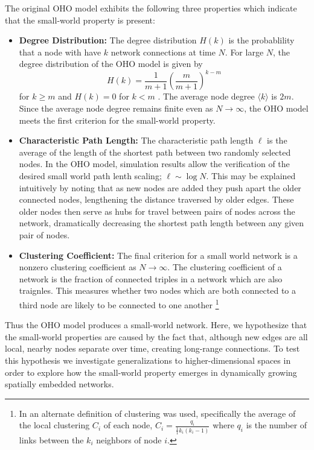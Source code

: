 \documentclass[aps,pre,reprint,superscriptaddress,amsmath,amssymb,nofootinbib]{revtex4-1}
\begin{document}
The original OHO model exhibits the following three properties which indicate that the small-world property is present:
\begin{itemize}
  \item \textbf{Degree Distribution:} The degree distribution $H(k)$ is the probablility that a node with have $k$ network connections at time $N$.
For large $N$, the degree distribution of the OHO model is given by 
\begin{equation}
H(k) = \frac{1}{m+1}\left(\frac{m}{m+1}\right)^{k-m}
\end{equation}
for $k \geq m$ and $H(k) = 0$ for $k < m$ \cite{ozik2004}.
The average node degree $\langle k \rangle$ is $2m$.
Since the average node degree remains finite even as $N \to \infty$, the OHO model meets the first criterion for the small-world property.
  \item \textbf{Characteristic Path Length:} The characteristic path length $\ell$ is the average of the length of the shortest path between two randomly selected nodes.
In the OHO model, simulation results allow the verification of the desired small world path lenth scaling; $\ell \sim \log N$.
This may be explained intuitively by noting that as new nodes are added they push apart the older connected nodes, lengthening the distance traversed by older edges. 
These older nodes then serve as hubs for travel between pairs of nodes across the network, dramatically decreasing the shortest path length between any given pair of nodes.
  \item \textbf{Clustering Coefficient:} The final criterion for a small world network is a nonzero clustering coefficient as $N \to \infty$. 
The clustering coefficient of a network is the fraction of connected triples in a network which are also traignles.
This measures whether two nodes which are both connected to a third node are likely to be connected to one another \footnote{In \cite{ozik2004} an alternate definition of clustering was used, specifically the average of the local clustering $C_i$ of each node, $C_i = \frac{q_i}{\frac{1}{1} k_i (k_i-1)}$ where $q_i$ is the number of links between the $k_i$ neighbors of node $i$.}
\end{itemize}
Thus the OHO model produces a small-world network.
Here, we hypothesize that the small-world properties are caused by the fact that, although new edges are all local, nearby nodes separate over time, creating long-range connections.
To test this hypothesis we investigate generalizations to higher-dimensional spaces in order to explore how the small-world property emerges in dynamically growing spatially embedded networks.
\end{document}
